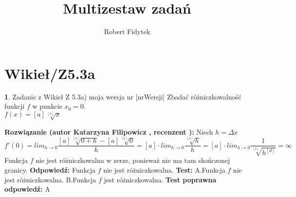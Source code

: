 \documentclass[12pt, a4paper]{article}
\title{Multizestaw zadań}
\author{Robert Fidytek}
\date{}
\theoremstyle{definition} %
\newtheorem{zad}{}
\newcommand{\kategoria}[1]{\section{#1}} %
\newcommand{\zadStart}[1]{\begin{zad}#1\newline} %
\newcommand{\zadStop}{\end{zad}}   %
\newcommand{\rozwStart}[2]{\noindent \textbf{Rozwiązanie (autor #1 , recenzent #2): }\newline} %
\newcommand{\rozwStop}{\newline}                                            %
\newcommand{\odpStart}{\noindent \textbf{Odpowiedź:}\newline}    %
\newcommand{\odpStop}{\newline}                                             %
\newcommand{\testStart}{\noindent \textbf{Test:}\newline} %
\newcommand{\testStop}{\newline} %
\newcommand{\kluczStart}{\noindent \textbf{Test poprawna odpowiedź:}\newline} %
\newcommand{\kluczStop}{\newline} %
\begin{document}
\maketitle


\kategoria{Wikieł/Z5.3a}
\zadStart{Zadanie z Wikieł Z 5.3a) moja wersja nr [nrWersji]}
Zbadać różniczkowalność funkcji $f$ w punkcie $x_0=0$.\\
$f(x)=[a]\sqrt[[x]]{x} $
\zadStop
\rozwStart{Katarzyna Filipowicz}{}
Niech $h=\Delta x$
$$
f'(0)=lim_{h\rightarrow 0} \frac{[a]\sqrt[[x]]{0+h}-[a]\sqrt[[x]]{0}}{h}
=[a]\cdot lim_{h\rightarrow 0} \frac{\sqrt[[x]]{h}}{h}=
[a]\cdot lim_{h\rightarrow 0} \frac{1}{\sqrt[[x]]{h^{[d]}}}=\infty
$$ 
Funkcja $f$ nie jest różniczkowalna w zerze, ponieważ nie ma tam skończonej granicy.
\rozwStop
\odpStart
Funkcja $f$ nie jest różniczkowalna.
\odpStop
\testStart
A.Funkcja $f$ nie jest różniczkowalna.
B.Funkcja $f$ jest różniczkowalna.
\testStop
\kluczStart
A
\kluczStop
\end{document}
